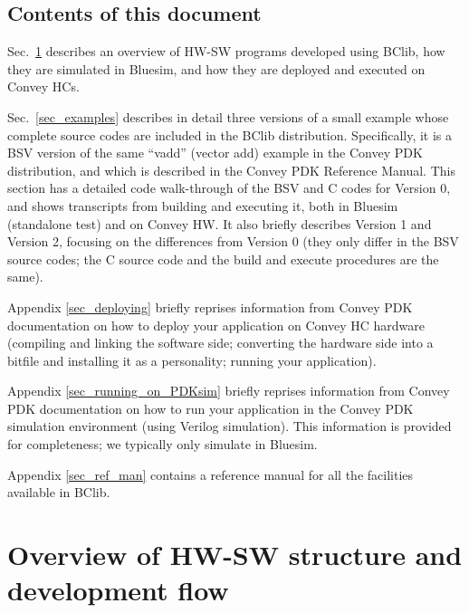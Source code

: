 \documentclass[twoside,letterpaper,11pt]{article}
\begin{document}

\subsection{Contents of this document}

Sec.~\ref{sec_overview} describes an overview of HW-SW programs
developed using BClib, how they are simulated in Bluesim, and how they
are deployed and executed on Convey HCs.

Sec.~\ref{sec_examples} describes in detail three versions of a small
example whose complete source codes are included in the BClib
distribution.  Specifically, it is a BSV version of the same ``vadd''
(vector add) example in the Convey PDK distribution, and which is
described in the Convey PDK Reference Manual.  This section has a
detailed code walk-through of the BSV and C codes for Version 0, and
shows transcripts from building and executing it, both in Bluesim
(standalone test) and on Convey HW.  It also briefly describes Version
1 and Version 2, focusing on the differences from Version 0 (they only
differ in the BSV source codes; the C source code and the build and
execute procedures are the same).

Appendix \ref{sec_deploying} briefly reprises information from Convey
PDK documentation on how to deploy your application on Convey HC
hardware (compiling and linking the software side; converting the
hardware side into a bitfile and installing it as a personality;
running your application).

Appendix \ref{sec_running_on_PDKsim} briefly reprises information from
Convey PDK documentation on how to run your application in the Convey
PDK simulation environment (using Verilog simulation).  This
information is provided for completeness; we typically only simulate
in Bluesim.

Appendix \ref{sec_ref_man} contains a reference manual for all the
facilities available in BClib.


\section{Overview of HW-SW structure and development flow}

\label{sec_overview}

\end{document}
